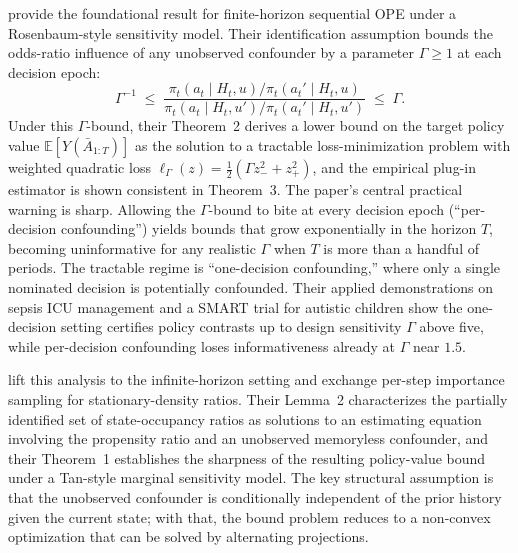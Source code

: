 \citet{namkoong2020off} provide the foundational result for finite-horizon sequential OPE under a Rosenbaum-style sensitivity model. Their identification assumption bounds the odds-ratio influence of any unobserved confounder by a parameter $\Gamma \geq 1$ at each decision epoch:
\begin{equation}
\Gamma^{-1} \;\leq\; \frac{\pi_t(a_t \mid H_t, u) / \pi_t(a_t' \mid H_t, u)}{\pi_t(a_t \mid H_t, u') / \pi_t(a_t' \mid H_t, u')} \;\leq\; \Gamma.
\label{eq:gamma_bound}
\end{equation}
Under this $\Gamma$-bound, their Theorem~2 derives a lower bound on the target policy value $\mathbb{E}[Y(\bar A_{1:T})]$ as the solution to a tractable loss-minimization problem with weighted quadratic loss $\ell_\Gamma(z) = \tfrac{1}{2}(\Gamma z_-^2 + z_+^2)$, and the empirical plug-in estimator is shown consistent in Theorem~3. The paper's central practical warning is sharp. Allowing the $\Gamma$-bound to bite at every decision epoch (``per-decision confounding'') yields bounds that grow exponentially in the horizon $T$, becoming uninformative for any realistic $\Gamma$ when $T$ is more than a handful of periods. The tractable regime is ``one-decision confounding,'' where only a single nominated decision is potentially confounded. Their applied demonstrations on sepsis ICU management and a SMART trial for autistic children show the one-decision setting certifies policy contrasts up to design sensitivity $\Gamma$ above five, while per-decision confounding loses informativeness already at $\Gamma$ near $1.5$.

\citet{kallus2020confounding} lift this analysis to the infinite-horizon setting and exchange per-step importance sampling for stationary-density ratios. Their Lemma~2 characterizes the partially identified set of state-occupancy ratios as solutions to an estimating equation involving the propensity ratio and an unobserved memoryless confounder, and their Theorem~1 establishes the sharpness of the resulting policy-value bound under a Tan-style marginal sensitivity model. The key structural assumption is that the unobserved confounder is conditionally independent of the prior history given the current state; with that, the bound problem reduces to a non-convex optimization that can be solved by alternating projections.

